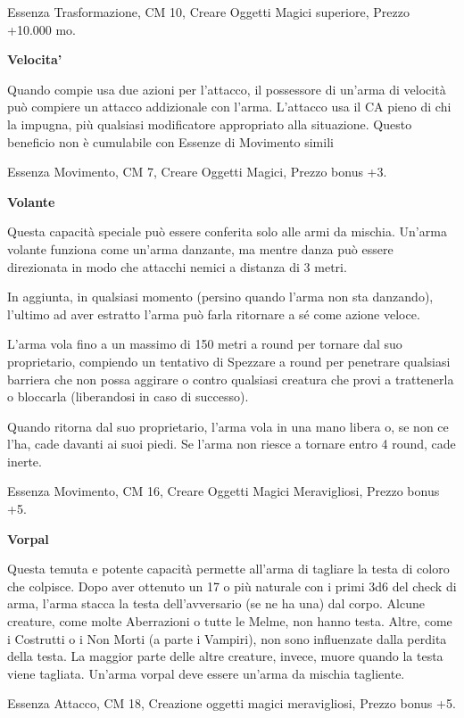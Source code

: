 \documentclass[a4paper,11pt,twoside,openany]{book}
\begin{document}
Essenza Trasformazione, CM 10, Creare Oggetti Magici superiore, Prezzo +10.000 mo.

\textbf{Velocita'}

Quando compie usa due azioni per l'attacco, il possessore di un'arma di velocità può compiere un attacco addizionale con l'arma. L'attacco usa il CA pieno di chi la impugna, più qualsiasi modificatore appropriato alla situazione. Questo beneficio non è cumulabile con Essenze di Movimento simili

Essenza Movimento, CM 7, Creare Oggetti Magici, Prezzo bonus +3.

\textbf{Volante}

Questa capacità speciale può essere conferita solo alle armi da mischia. Un'arma volante funziona come un'arma danzante, ma mentre danza può essere direzionata in modo che attacchi nemici a distanza di 3 metri.

In aggiunta, in qualsiasi momento (persino quando l'arma non sta danzando), l'ultimo ad aver estratto l'arma può farla ritornare a sé come azione veloce.

L'arma vola fino a un massimo di 150 metri a round per tornare dal suo proprietario, compiendo un tentativo di Spezzare a round per penetrare qualsiasi barriera che non possa aggirare o contro qualsiasi creatura che provi a trattenerla o bloccarla (liberandosi in caso di successo).

Quando ritorna dal suo proprietario, l'arma vola in una mano libera o, se non ce l'ha, cade davanti ai suoi piedi. Se l'arma non riesce a tornare entro 4 round, cade inerte.

Essenza Movimento, CM 16, Creare Oggetti Magici Meravigliosi, Prezzo bonus +5.

\textbf{Vorpal}

Questa temuta e potente capacità permette all'arma di tagliare la testa di coloro che colpisce. Dopo aver ottenuto un 17 o più naturale con i primi 3d6 del check di arma, l'arma stacca la testa dell'avversario (se ne ha una) dal corpo. Alcune creature, come molte Aberrazioni o tutte le Melme, non hanno testa. Altre, come i Costrutti o i Non Morti (a parte i Vampiri), non sono influenzate dalla perdita della testa. La maggior parte delle altre creature, invece, muore quando la testa viene tagliata. Un'arma vorpal deve essere un'arma da mischia tagliente.

Essenza Attacco, CM 18, Creazione oggetti magici meravigliosi, Prezzo bonus +5.
\end{document}

